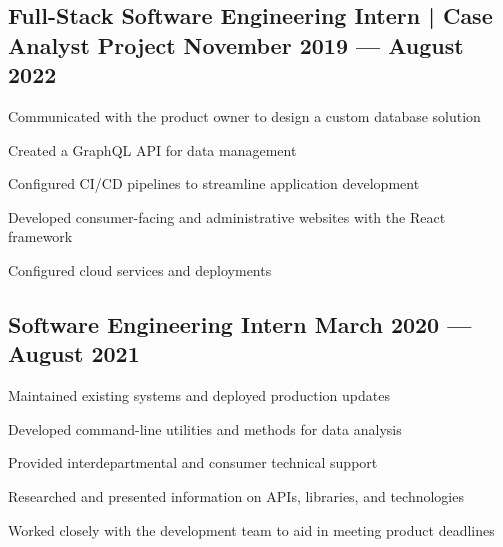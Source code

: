 \subsection{{Full-Stack Software Engineering Intern | Case Analyst Project \hfill November 2019 --- August 2022}}
\begin{zitemize}
\item Communicated with the product owner to design a custom database solution
\item Created a GraphQL API for data management
\item Configured CI/CD pipelines to streamline application development
\item Developed consumer-facing and administrative websites with the React framework
\item Configured cloud services and deployments
\end{zitemize}

\subsection{{Software Engineering Intern \hfill March 2020 --- August 2021}}
\begin{zitemize}
\item Maintained existing systems and deployed production updates
\item Developed command-line utilities and methods for data analysis
\item Provided interdepartmental and consumer technical support
\item Researched and presented information on APIs, libraries, and technologies
\item Worked closely with the development team to aid in meeting product deadlines
\end{zitemize}
